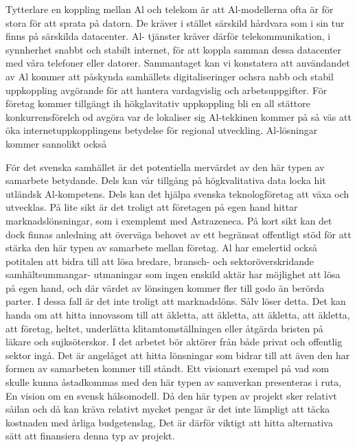 Tytterlare en koppling mellan Al och telekom är att Al-modellerna ofta är för stora för att sprata på datorn. De kräver i stället särskild hårdvara som i sin tur finns på särskilda datacenter. Al- tjänster kräver därför telekommunikation, i synnherhet snabbt och stabilt internet, för att koppla samman dessa datacenter med våra telefoner eller datorer.
Sammantaget kan vi konstatera att användandet av Al kommer att påskynda samhällets digitaliseringer ochsra nabb och stabil uppkoppling avgörande för att hantera vardagvislig och arbetsuppgifter. För företag kommer tillgängt ih hökglavitativ uppkoppling bli en all stättore konkurrensförelch od avgöra var de lokaliser sig Al-tekkinen kommer på så väs att öka internetuppkopplingens betydelse för regional utveckling. Al-lösningar kommer sannolikt också

För det svenska samhället är det potentiella mervärdet av den här typen av samarbete betydande. Dels kan vår tillgång på högkvalitativa data locka hit utländsk Al-kompetens. Dels kan det hjälpa svenska teknologföretag att växa och utvecklas. På lite sikt är det troligt att företagen på egen hand hittar marknadslönsningar, som i exemplemt med Astrazeneca. På kort sikt kan det dock finnas anledning att överväga behovet av ett begränsat offentligt stöd för att stärka den här typen av samarbete mellan företag.
Al har emelertid också potitalen att bidra till att lösa bredare, bransch- och sektoröverskridande samhältsummangar- utmaningar som ingen enskild aktär har möjlighet att lösa på egen hand, och där värdet av lönsingen kommer fler till godo än berörda parter. I dessa fall är det inte troligt att marknadslöns. Sålv löser detta. Det kan handa om att hitta innovasom till att äkletta, att äkletta, att äkletta, att äkletta, att företag, heltet, underlätta klitamtomställningen eller åtgärda bristen på läkare och sujksöterskor. I det arbetet bör aktörer från både privat och offentlig sektor ingå. Det är angelåget att hitta lönsningar som bidrar till att även den har formen av samarbeten kommer till ståndt. Ett visionart exempel på vad som skulle kunna åstadkommas med den här typen av samverkan presenteras i ruta, En vision om en svensk hälsomodell. Då den här typen av projekt sker relativt såilan och då kan kräva relativt mycket pengar är det inte lämpligt att täcka kostnaden med årliga budgetenslag, Det är därför viktigt att hitta alternativa sätt att finansiera denna typ av projekt.
